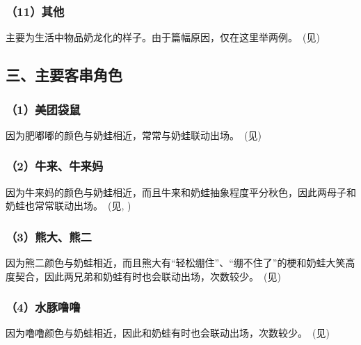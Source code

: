 \subsubsection{（11）其他}

主要为生活中物品奶龙化的样子。由于篇幅原因，仅在这里举两例。~(见)



\subsection{三、主要客串角色}

\subsubsection{（1）美团袋鼠}

因为肥嘟嘟的颜色与奶蛙相近，常常与奶蛙联动出场。~(见)



\clearpage
\subsubsection{（2）牛来、牛来妈}

因为牛来妈的颜色与奶蛙相近，而且牛来和奶蛙抽象程度平分秋色，因此两母子和奶蛙也常常联动出场。~(见, )





\subsubsection{（3）熊大、熊二}

因为熊二颜色与奶蛙相近，而且熊大有“轻松绷住”、“绷不住了”的梗和奶蛙大笑高度契合，因此两兄弟和奶蛙有时也会联动出场，次数较少。~(见)



\clearpage
\subsubsection{（4）水豚噜噜}

因为噜噜颜色与奶蛙相近，因此和奶蛙有时也会联动出场，次数较少。~(见)



